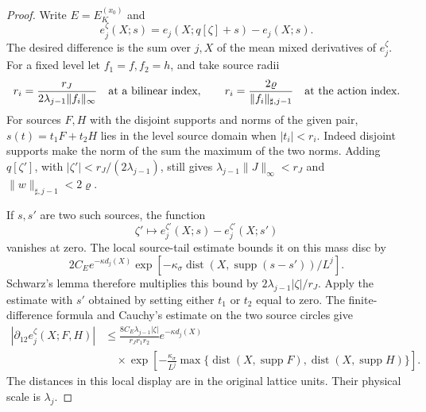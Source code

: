 \documentclass[11pt,letterpaper,reqno]{amsart}
\theoremstyle{definition}
\theoremstyle{remark}
\begin{document}
\begin{proof}
Write \(E=E_K^{(x_0)}\) and
\[
 e_j^\zeta(X;s)=e_j(X;q[\zeta]+s)-e_j(X;s).
\]
The desired difference is the sum over \(j,X\) of the mean
mixed derivatives of \(e_j^\zeta\).
For a fixed level let \(f_1=f,f_2=h\), and take source radii
\[
 r_i=\frac{r_J}{2\lambda_{j-1}\|f_i\|_\infty}
       \quad\hbox{at a bilinear index},\qquad
 r_i=\frac{2\varrho}{\|f_i\|_{\sharp,j-1}}
       \quad\hbox{at the action index}.
\]
For sources \(F,H\) with the disjoint supports and norms of
the given pair, \(s(t)=t_1F+t_2H\) lies in the level source
domain when \(|t_i|<r_i\). Indeed disjoint supports make the
norm of the sum the maximum of the two norms. Adding
\(q[\zeta']\), with
\(|\zeta'|<r_J/(2\lambda_{j-1})\), still gives
\(\lambda_{j-1}\|J\|_\infty<r_J\) and
\(\|w\|_{\sharp,j-1}<2\varrho\).

If \(s,s'\) are two such sources, the function
\[
 \zeta'\longmapsto e_j^{\zeta'}(X;s)-e_j^{\zeta'}(X;s')
\]
vanishes at zero. The local source-tail estimate bounds it
on this mass disc by
\[
 2C_Ee^{-\kappa d_j(X)}
   \exp\left[-\kappa_\sigma
             \operatorname{dist}(X,\operatorname{supp}(s-s'))/L^j\right].
\]
Schwarz's lemma therefore multiplies this bound by
\(2\lambda_{j-1}|\zeta|/r_J\).
Apply the estimate with \(s'\) obtained by setting either
\(t_1\) or \(t_2\) equal to zero. The finite-difference
formula and Cauchy's estimate on the two source circles give
\begin{equation}\label{eq:qcdm2-shifted-local-derivative}
 \begin{split}
 |\partial_{12}e_j^\zeta(X;F,H)|
 &\le \frac{8C_E\lambda_{j-1}|\zeta|}{r_Jr_1r_2}
             e^{-\kappa d_j(X)}\\
 &\quad{}\times
 \exp\left[-\frac{\kappa_\sigma}{L^j}
     \max\{\operatorname{dist}(X,\operatorname{supp}F),
            \operatorname{dist}(X,\operatorname{supp}H)\}\right].
 \end{split}
\end{equation}
The distances in this local display are in the original
lattice units. Their physical scale is \(\lambda_j\).


\end{proof}
\end{document}
